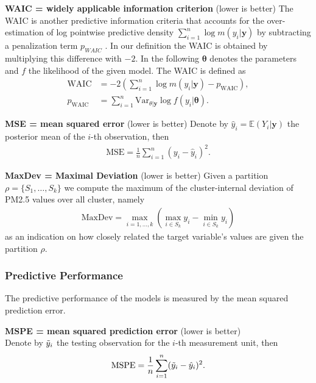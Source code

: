 \documentclass[12pt,a4paper]{article}
\begin{document}
\textbf{WAIC = widely applicable information criterion} (lower is better)
The WAIC is another predictive information criteria that accounts for the over-estimation of log pointwise predictive density $\sum_{i=1}^n \log m(y_i | \mathbf{y})$ by subtracting a penalization term $p_{WAIC}$ \cite{lecturenotes}. In our definition the WAIC is obtained by multiplying this difference with $-2$. In the following $\mathbf{\theta}$ denotes the parameters and $f$ the likelihood of the given model. The WAIC is defined as
\begin{align*}
    \text{WAIC} &= -2 \left( \sum_{i=1}^n \log m(y_i | \mathbf{y} ) - 
    p_{\text{WAIC}} \right), \\
    p_{\text{WAIC}} &= \sum_{i=1}^n \text{Var}_{\theta | \mathbf{y}} \log 
    f(y_i | \mathbf{\theta} ).
\end{align*}

\textbf{MSE = mean squared error} (lower is better)
Denote by $\hat{y}_i = \mathbb{E}(Y_i | \mathbf{y})$ the posterior mean of the $i$-th observation, then
\begin{align*}
    \text{MSE} = \frac{1}{n} \sum_{i=1}^n (y_i - \hat{y}_i)^2.
\end{align*}

\textbf{MaxDev = Maximal Deviation} (lower is better)
Given a partition $\rho
= \{S_1, \ldots, S_k\}$ we compute the maximum of the cluster-internal 
deviation of PM2.5 values over all cluster, namely
\begin{align*}
    \text{MaxDev} = \max_{i=1, \ldots, k} \left(\max_{i\in S_k} y_i - 
    \min_{i\in S_k} y_i
     \right)
\end{align*}
as an indication on how closely related the target variable's
values are given the partition $\rho$.


\subsubsection{Predictive Performance}
The predictive performance of the models is measured by the mean squared prediction error.

\textbf{MSPE = mean squared prediction error} (lower is better)\\
Denote by $\Tilde{y}_i$ the testing observation for the $i$-th measurement unit, then
\begin{align*}
    \text{MSPE} = \frac{1}{n} \sum_{i=1}^n (\Tilde{y}_i - \hat{y}_i)^2.
\end{align*}
\end{document}
